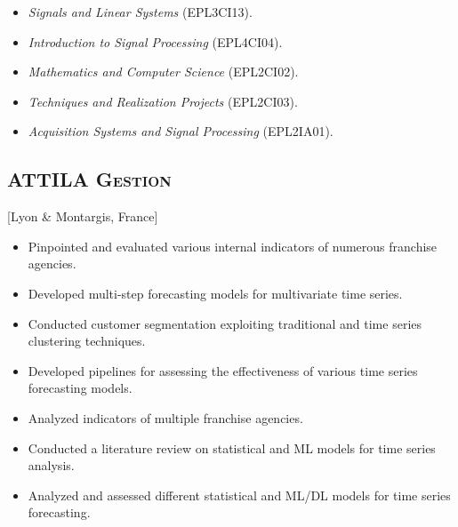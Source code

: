 \documentclass{mycv}
\begin{document}
\begin{positions}
\end{positions}

\begin{itemize}
  \itemsep 0em
  \item \textit{Signals and Linear Systems} (EPL3CI13).
  \item \textit{Introduction to Signal Processing} (EPL4CI04).
  \item \textit{Mathematics and Computer Science} (EPL2CI02).
  \item \textit{Techniques and Realization Projects} (EPL2CI03).
  \item \textit{Acquisition Systems and Signal Processing} (EPL2IA01).
\end{itemize}

\subsection{\scshape ATTILA Gestion}[Lyon \& Montargis, France]

\begin{positions}
\end{positions}

\begin{itemize}
  \itemsep 0em
  \item Pinpointed and evaluated various internal indicators of numerous franchise agencies.
  \item Developed multi-step forecasting models for multivariate time series.
  \item Conducted customer segmentation exploiting traditional and time series clustering techniques.
  \item Developed pipelines for assessing the effectiveness of various time series forecasting models.
\end{itemize}

\begin{positions}
\end{positions}

\begin{itemize}
  \itemsep 0em
  \item Analyzed indicators of multiple franchise agencies.
  \item Conducted a literature review on statistical and ML models for time series analysis.
  \item Analyzed and assessed different statistical and ML/DL models for time series forecasting.
\end{itemize}
\end{document}
